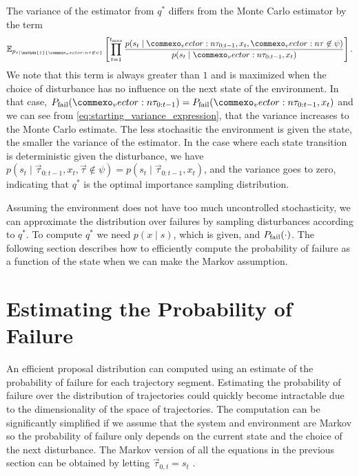 The variance of the estimator from $q^*$ differs from the Monte Carlo estimator by the term
\begin{equation}
    \mathbb{E}_{p_{\tau \mid \mathds{1} \{\vec{\tau} \not \in \psi\}}}  \left[ \prod_{t=1}^{t_{\rm max}} \frac{p(s_t \mid \vec{\tau}_{0:t-1}, x_t, \vec{\tau} \not \in \psi )}{p(s_t \mid \vec{\tau}_{0:t-1}, x_t)} \right] \text{.}
\end{equation}
We note that this term is always greater than $1$ and is maximized when the choice of disturbance has no influence on the next state of the environment. In that case, $P_{\rm fail}(\vec{\tau}_{0:t-1}) = P_{\rm fail}(\vec{\tau}_{0:t-1}, x_t)$ and we can see from  \cref{eq:starting_variance_expression}, that the variance increases to the Monte Carlo estimate. The less stochasitic the environment is given the state, the smaller the variance of the estimator. In the case where each state transition is deterministic given the disturbance, we have $p(s_t \mid \vec{\tau}_{0:t-1}, x_t, \vec{\tau} \not \in \psi ) = p(s_t \mid \vec{\tau}_{0:t-1}, x_t)$, and the variance goes to zero, indicating that $q^*$ is the optimal importance sampling distribution. 

Assuming the environment does not have too much uncontrolled stochasticity, we can approximate the distribution over failures by sampling disturbances according to $q^*$. To compute $q^*$ we need $p(x \mid s)$, which is given, and $P_{\rm fail}(\cdot)$.  The following section describes how to efficiently compute the probability of failure as a function of the state when we can make the Markov assumption.


\section{Estimating the Probability of Failure}

An efficient proposal distribution can computed using an estimate of the probability of failure for each trajectory segment. Estimating the probability of failure over the distribution of trajectories could quickly become intractable due to the dimensionality of the space of trajectories. The computation can be significantly simplified if we assume that the system and environment are Markov so the probability of failure only depends on the current state and the choice of the next disturbance. The Markov version of all the equations in the previous section can be obtained by letting $\vec{\tau}_{0,t} = s_t$ .

